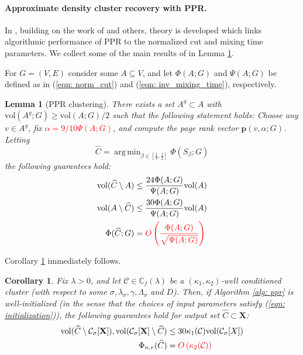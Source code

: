 \documentclass{article}
\newcommand{\vol}{\mathrm{vol}}
\newcommand{\1}{\mathbf{1}}
\newcommand{\pbf}{\mathbf{p}}
\newcommand{\Xbf}{\mathbf{X}}
\newcommand{\Cbb}{\mathbb{C}}
\newcommand{\Cset}{\mathcal{C}}
\newcommand{\Csig}{\Cset_{\sigma}}
\DeclareMathOperator*{\argmin}{arg\,min}
\theoremstyle{aldenthm}
\newtheorem{lemma}{Lemma}
\newtheorem{corollary}{Corollary}
\theoremstyle{remark}
\begin{document}
\paragraph{Approximate density cluster recovery with PPR.}

In \cite{zhu2013}, building on the work of \cite{anderson2006} and others, theory is developed which links algorithmic performance of PPR to the normalized cut and mixing time parameters. We collect some of the main results of \cite{zhu2013} in Lemma \ref{lem: ppr_cluster}.

For $G = (V,E)$ consider some $A \subseteq V$, and let $\Phi(A; G)$ and $\Psi(A; G)$ be defined as in (\ref{eqn: norm_cut}) and (\ref{eqn: inv_mixing_time}), respectively.
\begin{lemma}[PPR clustering]
	\label{lem: ppr_cluster}
	There exists a set $A^g \subset A$ with $\vol(A^g;G) \geq \vol(A;G)/2$ such that the following statement holds: Choose any $v \in A^g$, fix \textcolor{red}{$\alpha = 9 / 10 \Psi(A; G)$}, and compute the page rank vector $\pbf(v,\alpha; G)$. Letting 
	\begin{equation*}
	\widehat{C} = \argmin_{\beta \in [\frac{1}{8}, \frac{1}{2}]} \Phi(S_{\beta}; G)
	\end{equation*}
	the following guarantees hold:
	\begin{align*}
	\vol(\widehat{C} \setminus A) & \leq \frac{24 \Phi(A; G)}{\Psi(A; G)} \vol(A) \\
	\vol(A \setminus \widehat{C})  & \leq \frac{30 \Phi(A; G)}{\Psi(A; G)} \vol(A) \\
	\Phi(\widehat{C}; G) & = \textcolor{red}{O\left(\frac{\Phi(A; G)}{\sqrt{\Psi(A; G)}}\right)}
	\end{align*}
\end{lemma}

Corollary \ref{cor: ppr_cluster} immediately follows.
\begin{corollary}
	\label{cor: ppr_cluster}
	Fix $\lambda > 0$, and let $\Cset \in \Cbb_f(\lambda)$ be a $(\kappa_1,\kappa_2)$-well conditioned cluster (with respect to some $\sigma, \lambda_{\sigma}, \gamma, \Lambda_{\sigma}$ and $D$). Then, if Algorithm \ref{alg: ppr} is well-initialized (in the sense that the choices of input parameters satisfy (\ref{eqn: initialization})), the following guarantees hold for output set $\widehat{C} \subset \Xbf$:
	\begin{align*}
	\vol(\widehat{C} \setminus \Csig[\Xbf]), \vol(\Csig[\Xbf] \setminus \widehat{C})  & \leq 30 \kappa_1(\Cset) \vol(\Csig[X]) \\
	\Phi_{n,r}(\widehat{C}) & = \textcolor{red}{O\left(\kappa_2(\Cset)\right)}
	\end{align*}
\end{corollary}
\end{document}
